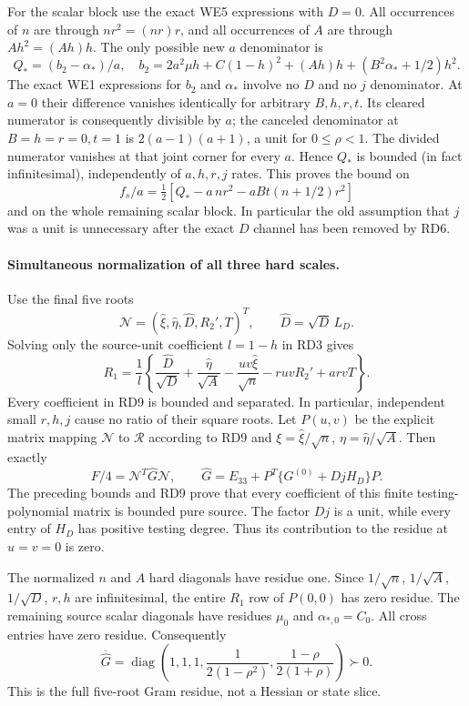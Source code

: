 For the scalar block use the exact WE5 expressions with $D=0$.
All occurrences of $n$ are through $nr^2=(nr)r$, and all occurrences
of $A$ are through $Ah^2=(Ah)h$. The only possible new $a$ denominator
is
\[
 Q_*=(b_2-\alpha_*)/a,\quad
 b_2=2a^2\mu h+C(1-h)^2+(Ah)h+(B^2\alpha_*+1/2)h^2. \tag{RD7}
\]
The exact WE1 expressions for $b_2$ and $\alpha_*$ involve no $D$
and no $j$ denominator. At $a=0$ their difference vanishes identically
for arbitrary $B,h,r,t$. Its cleared numerator is consequently
divisible by $a$; the canceled denominator at $B=h=r=0,t=1$ is
$2(a-1)(a+1)$, a unit for $0\le\rho<1$. The divided numerator
vanishes at that joint corner for every $a$. Hence $Q_*$ is bounded
(in fact infinitesimal), independently of $a,h,r,j$ rates.
This proves the bound on
\[
 f_s/a=\tfrac12[Q_*-a\,nr^2-aBt(n+1/2)r^2]
\]
and on the whole remaining scalar block. In particular the old
assumption that $j$ was a unit is unnecessary after the exact $D$
channel has been removed by RD6.

\paragraph{Simultaneous normalization of all three hard scales.}
Use the final five roots
\[
 \mathcal N=(\widehat\xi,\widehat\eta,\widehat D,R_2',T)^T,
 \qquad\widehat D=\sqrt D\,L_D.                    \tag{RD8}
\]
Solving only the source-unit coefficient $l=1-h$ in RD3 gives
\[
 R_1=\frac1l\left\{
 \frac{\widehat D}{\sqrt D}
 +\frac{\widehat\eta}{\sqrt A}
 -\frac{uv\widehat\xi}{\sqrt n}
 -ruvR_2'+arvT\right\}.                            \tag{RD9}
\]
Every coefficient in RD9 is bounded and separated. In particular,
independent small $r,h,j$ cause no ratio of their square roots.
Let $P(u,v)$ be the explicit matrix mapping $\mathcal N$ to
$\mathcal R$ according to RD9 and
$\xi=\widehat\xi/\sqrt n$, $\eta=\widehat\eta/\sqrt A$.
Then exactly
\[
 F/4=\mathcal N^T\widehat G\mathcal N,
 \qquad
 \widehat G=E_{33}+P^T\{G^{(0)}+DjH_D\}P.          \tag{RD10}
\]
The preceding bounds and RD9 prove that every coefficient of this
finite testing-polynomial matrix is bounded pure source. The factor
$Dj$ is a unit, while every entry of $H_D$ has positive testing degree.
Thus its contribution to the residue at $u=v=0$ is zero.

The normalized $n$ and $A$ hard diagonals have residue one. Since
$1/\sqrt n$, $1/\sqrt A$, $1/\sqrt D$, $r,h$ are infinitesimal,
the entire $R_1$ row of $P(0,0)$ has zero residue. The remaining
source scalar diagonals have residues $\mu_0$ and $\alpha_{*,0}=C_0$.
All cross entries have zero residue. Consequently
\[
 \overline{\widehat G}
   =\operatorname{diag}\left(1,1,1,
              \frac1{2(1-\rho^2)},
              \frac{1-\rho}{2(1+\rho)}\right)\succ0. \tag{RD11}
\]
This is the full five-root Gram residue, not a Hessian or state slice.

